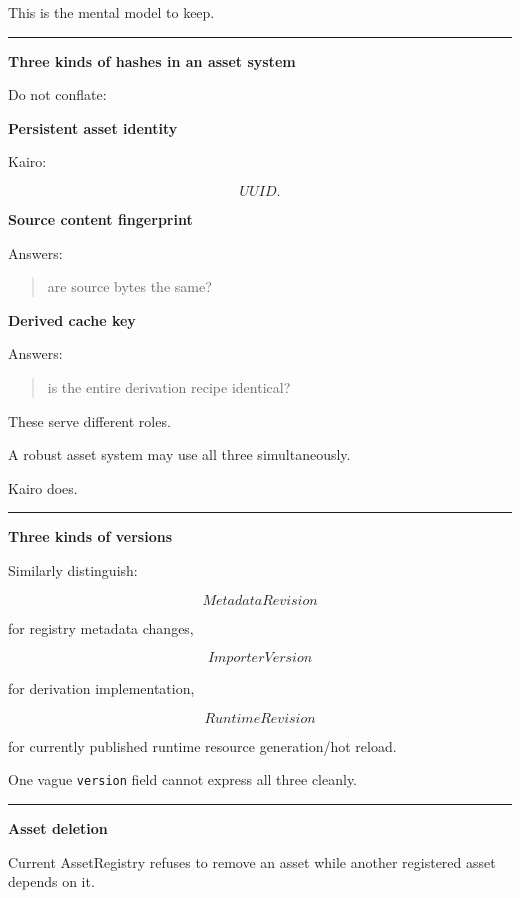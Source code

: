 This is the mental model to keep.

\begin{center}\rule{0.5\linewidth}{0.5pt}\end{center}

\textbf{Three kinds of hashes in an asset system}

Do not conflate:

\textbf{Persistent asset identity}

Kairo:

\[
UUID.
\]

\textbf{Source content fingerprint}

Answers:

\begin{quote}
are source bytes the same?
\end{quote}

\textbf{Derived cache key}

Answers:

\begin{quote}
is the entire derivation recipe identical?
\end{quote}

These serve different roles.

A robust asset system may use all three simultaneously.

Kairo does.

\begin{center}\rule{0.5\linewidth}{0.5pt}\end{center}

\textbf{Three kinds of versions}

Similarly distinguish:

\[
MetadataRevision
\]

for registry metadata changes,

\[
ImporterVersion
\]

for derivation implementation,

\[
RuntimeRevision
\]

for currently published runtime resource generation/hot reload.

One vague \texttt{version} field cannot express all three cleanly.

\begin{center}\rule{0.5\linewidth}{0.5pt}\end{center}

\textbf{Asset deletion}

Current AssetRegistry refuses to remove an asset while another registered asset depends on it.

